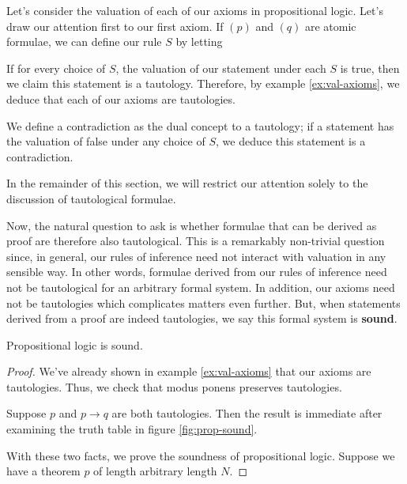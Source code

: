 \begin{ex}
	Let's consider the valuation of each of our axioms in propositional logic.
	Let's draw our attention first to our first axiom. If $(p)$ and $(q)$ are atomic formulae, we can define our rule $S$ by letting
	
	\label{ex:val-axioms}
\end{ex}

If for every choice of $S$, the valuation of our statement under each $S$ is true, then we claim this statement is a tautology.
Therefore, by example \eqref{ex:val-axioms}, we deduce that each of our axioms are tautologies.

We define a contradiction as the dual concept to a tautology; if a statement has the valuation of false under any choice of $S$, we deduce this statement is a contradiction.

In the remainder of this section, we will restrict our attention solely to the discussion of tautological formulae.

Now, the natural question to ask is whether formulae that can be derived as proof are therefore also tautological.
This is a remarkably non-trivial question since, in general, our rules of inference need not interact with valuation in any sensible way.
In other words, formulae derived from our rules of inference need not be tautological for an arbitrary formal system.
In addition, our axioms need not be tautologies which complicates matters even further.
But, when statements derived from a proof are indeed tautologies, we say this formal system is \textbf{sound}.

\begin{thm}
	Propositional logic is sound.	
\end{thm}
\begin{proof}
	We've already shown in example \eqref{ex:val-axioms} that our axioms are tautologies.
	Thus, we check that modus ponens preserves tautologies.
	
	Suppose $p$ and $p \to q$ are both tautologies.
	Then the result is immediate after examining the truth table in figure \eqref{fig:prop-sound}.
	
	With these two facts, we prove the soundness of propositional logic.
	Suppose we have a theorem $p$ of length arbitrary length $N$.
	
\end{proof}






